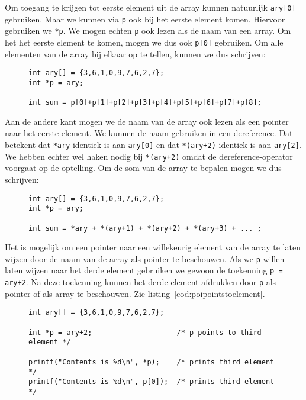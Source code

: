 Om toegang te krijgen tot eerste element uit de array kunnen natuurlijk \texttt{ary[0]} gebruiken. Maar we kunnen via \texttt{p} ook bij het eerste element komen. Hiervoor gebruiken we \texttt{*p}. We mogen echten \texttt{p} ook lezen als de naam van een array. Om het het eerste element te komen, mogen we dus ook \texttt{p[0]} gebruiken. Om alle elementen van de array bij elkaar op te tellen, kunnen we dus schrijven:

\begin{figure}[!ht]
\begin{lstlisting}[caption=Bepalen sum van elementen in een array.,label=cod:poiarrayandpointersym]
int ary[] = {3,6,1,0,9,7,6,2,7};
int *p = ary;

int sum = p[0]+p[1]+p[2]+p[3]+p[4]+p[5]+p[6]+p[7]+p[8];
\end{lstlisting}
\end{figure}

Aan de andere kant mogen we de naam van de array ook lezen als een pointer naar het eerste element. We kunnen de naam gebruiken in een dereference. Dat betekent dat \texttt{*ary} identiek is aan \texttt{ary[0]} en dat \texttt{*(ary+2)} identiek is aan \texttt{ary[2]}. We hebben echter wel haken nodig bij \texttt{*(ary+2)} omdat de dereference-operator voorgaat op de optelling. Om de som van de array te bepalen mogen we dus schrijven:

\begin{figure}[!ht]
\begin{lstlisting}[caption=Bepalen sum van elementen in een array.,label=cod:poiarrayandpointersym2]
int ary[] = {3,6,1,0,9,7,6,2,7};
int *p = ary;

int sum = *ary + *(ary+1) + *(ary+2) + *(ary+3) + ... ;
\end{lstlisting}
\end{figure}

Het is mogelijk om een pointer naar een willekeurig element van de array te laten wijzen door de naam van de array als pointer te beschouwen. Als we \texttt{p} willen laten wijzen naar het derde element gebruiken we gewoon de toekenning \texttt{p = ary+2}. Na deze toekenning kunnen het derde element afdrukken door \texttt{p} als pointer of als array te beschouwen. Zie listing~\ref{cod:poipointstoelement}.

\begin{figure}[!ht]
\begin{lstlisting}[caption=Pointer die naar een element in een array wijst.,label=cod:poipointstoelement]
int ary[] = {3,6,1,0,9,7,6,2,7};

int *p = ary+2;                    /* p points to third element */

printf("Contents is %d\n", *p);    /* prints third element */
printf("Contents is %d\n", p[0]);  /* prints third element */
\end{lstlisting}
\end{figure}

